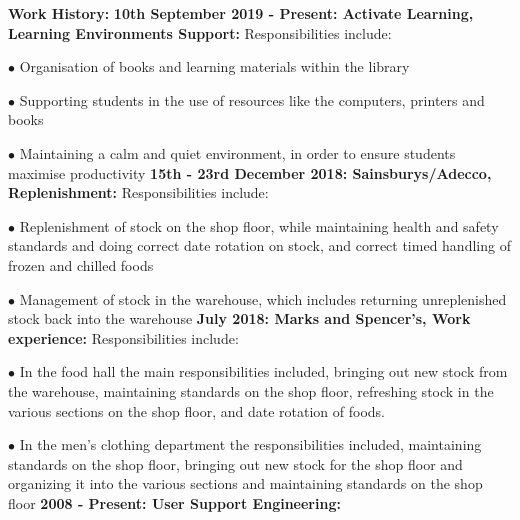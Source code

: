 \documentclass[10pt,a4paper]{book}
\begin{document}
\begin{flushleft}
  \textbf {Work History:}
  \linebreak{}
  \linebreak{}
  \textbf {10th September 2019 - Present: Activate Learning, Learning Environments Support:}
  \linebreak{}
  Responsibilities include:

\item[$\bullet$] Organisation of books and learning materials within the library

\item[$\bullet$] Supporting students in the use of resources like the computers, printers and books

\item[$\bullet$] Maintaining a calm and quiet environment, in order to ensure students maximise productivity
  \linebreak{}
  \linebreak{}
\textbf {15th - 23rd December 2018: Sainsburys/Adecco, Replenishment:}
  \linebreak{}
  Responsibilities include:

\item[$\bullet$] Replenishment of stock on the shop floor, while maintaining health and safety standards and doing correct date rotation on stock, and correct timed handling of frozen and chilled foods

\item[$\bullet$] Management of stock in the warehouse, which includes returning unreplenished stock back into the warehouse
  \linebreak{}
  \linebreak{}
\textbf {July 2018: Marks and Spencer's, Work experience:}
  \linebreak{}
Responsibilities include:

  \item[$\bullet$] In the food hall the main responsibilities included, bringing out new stock from the warehouse, maintaining standards on the shop floor, refreshing stock in the various sections on the shop floor, and date rotation of foods. 
  \item[$\bullet$] In the men's clothing department the responsibilities included, maintaining standards on the shop floor, bringing out new stock for the shop floor and organizing it into the various sections and maintaining standards on the shop floor
    \linebreak{}
    \linebreak{}
  \textbf {2008 - Present: User Support Engineering:} 


\end{flushleft}
\end{document}
